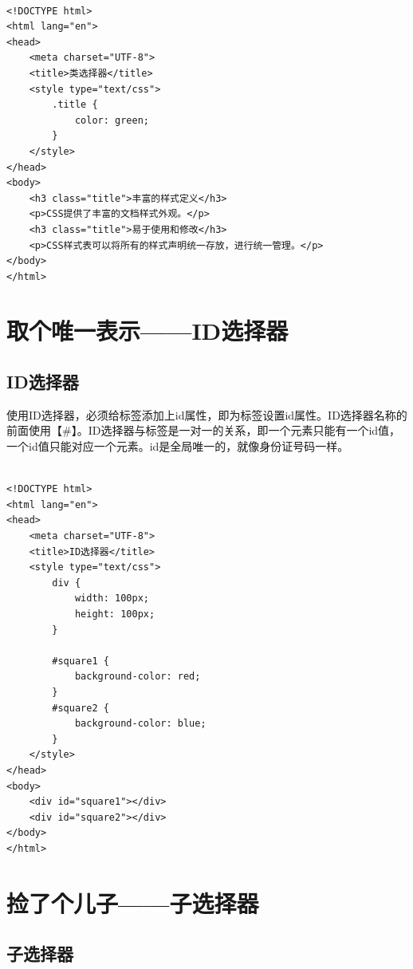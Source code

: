  \\
\begin{lstlisting}[style=htmlcssjs]
<!DOCTYPE html>
<html lang="en">
<head>
    <meta charset="UTF-8">
    <title>类选择器</title>
    <style type="text/css">
        .title {
            color: green;
        }
    </style>
</head>
<body>
    <h3 class="title">丰富的样式定义</h3>
    <p>CSS提供了丰富的文档样式外观。</p>
    <h3 class="title">易于使用和修改</h3>
    <p>CSS样式表可以将所有的样式声明统一存放，进行统一管理。</p>
</body>
</html>
\end{lstlisting}

\newpage

\section{取个唯一表示——ID选择器}

\subsection{ID选择器}

使用ID选择器，必须给标签添加上id属性，即为标签设置id属性。ID选择器名称的前面使用【\#】。ID选择器与标签是一对一的关系，即一个元素只能有一个id值，一个id值只能对应一个元素。id是全局唯一的，就像身份证号码一样。 \\

 \\
\begin{lstlisting}[style=htmlcssjs]
<!DOCTYPE html>
<html lang="en">
<head>
    <meta charset="UTF-8">
    <title>ID选择器</title>
    <style type="text/css">
        div {
            width: 100px;
            height: 100px;
        }

        #square1 {
            background-color: red;
        }
        #square2 {
            background-color: blue;
        }
    </style>
</head>
<body>
    <div id="square1"></div>
    <div id="square2"></div>
</body>
</html>
\end{lstlisting}

\newpage

\section{捡了个儿子——子选择器}

\subsection{子选择器}

